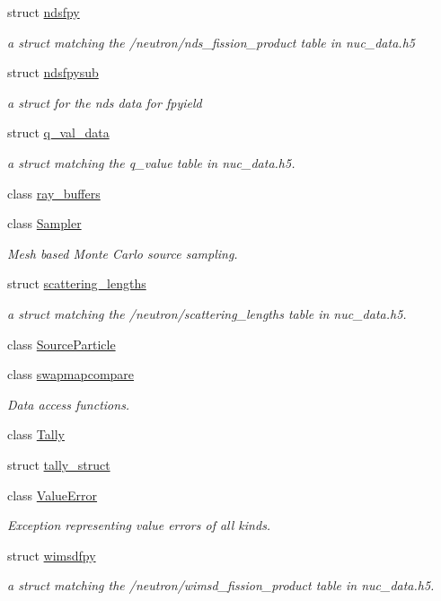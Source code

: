 \begin{DoxyCompactItemize}
struct \hyperlink{structpyne_1_1ndsfpy}{ndsfpy}
\begin{DoxyCompactList}\small\item\em a struct matching the \textquotesingle{}/neutron/nds\+\_\+fission\+\_\+product\textquotesingle{} table in nuc\+\_\+data.\+h5 \end{DoxyCompactList}\item 
struct \hyperlink{structpyne_1_1ndsfpysub}{ndsfpysub}
\begin{DoxyCompactList}\small\item\em a struct for the nds data for fpyield \end{DoxyCompactList}\item 
struct \hyperlink{structpyne_1_1q__val__data}{q\+\_\+val\+\_\+data}
\begin{DoxyCompactList}\small\item\em a struct matching the q\+\_\+value table in nuc\+\_\+data.\+h5. \end{DoxyCompactList}\item 
class \hyperlink{classpyne_1_1ray__buffers}{ray\+\_\+buffers}
\item 
class \hyperlink{classpyne_1_1_sampler}{Sampler}
\begin{DoxyCompactList}\small\item\em Mesh based Monte Carlo source sampling. \end{DoxyCompactList}\item 
struct \hyperlink{structpyne_1_1scattering__lengths}{scattering\+\_\+lengths}
\begin{DoxyCompactList}\small\item\em a struct matching the \textquotesingle{}/neutron/scattering\+\_\+lengths\textquotesingle{} table in nuc\+\_\+data.\+h5. \end{DoxyCompactList}\item 
class \hyperlink{classpyne_1_1_source_particle}{Source\+Particle}
\item 
class \hyperlink{classpyne_1_1swapmapcompare}{swapmapcompare}
\begin{DoxyCompactList}\small\item\em Data access functions. \end{DoxyCompactList}\item 
class \hyperlink{classpyne_1_1_tally}{Tally}
\item 
struct \hyperlink{structpyne_1_1tally__struct}{tally\+\_\+struct}
\item 
class \hyperlink{classpyne_1_1_value_error}{Value\+Error}
\begin{DoxyCompactList}\small\item\em Exception representing value errors of all kinds. \end{DoxyCompactList}\item 
struct \hyperlink{structpyne_1_1wimsdfpy}{wimsdfpy}
\begin{DoxyCompactList}\small\item\em a struct matching the \textquotesingle{}/neutron/wimsd\+\_\+fission\+\_\+product\textquotesingle{} table in nuc\+\_\+data.\+h5. \end{DoxyCompactList}\end{DoxyCompactItemize}

